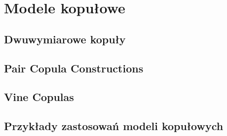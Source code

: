 \chapter{Modele kopułowe}
\label{ch:modele_kopulowe}


\section{Dwuwymiarowe kopuły}
\label{sec:dwuwymiarowe_kopuly}


\section{Pair Copula Constructions}
\label{sec:pair_copula_constructions}


\section{Vine Copulas}
\label{sec:vine_copulas}


\section{Przykłady zastosowań modeli kopułowych}
\label{sec:przyklady_zastosowan_modeli_kopulowych}
		
\mgrclosechapter